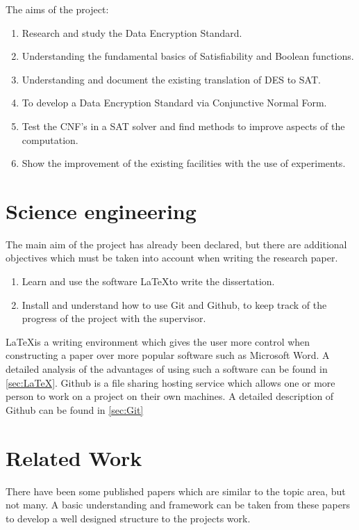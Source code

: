 \documentclass[11pt,a4paper]{report}
\begin{document}
The aims of the project:

\begin{enumerate}
\item Research and study the Data Encryption Standard.
\item Understanding the fundamental basics of Satisfiability and Boolean functions.
\item Understanding and document the existing translation of DES to SAT.
\item To develop a Data Encryption Standard via Conjunctive Normal Form.
\item Test the CNF's in a SAT solver and find methods to improve aspects of the computation.
\item Show the improvement of the existing facilities with the use of experiments.
\end{enumerate}


\section{Science engineering}
\label{sec:sciEng}
The main aim of the project has already been declared, but there are additional objectives which must be taken into account when writing the research paper. 
\begin{enumerate}
\item Learn and use the software \LaTeX \space to write the dissertation.
\item Install and understand how to use Git and Github, to keep track of the progress of the project with the supervisor.
\end{enumerate}
\LaTeX \space is a writing environment which gives the user more control when constructing a paper over more popular software such as Microsoft Word. A detailed analysis of the advantages of using such a software can be found in \ref{sec:LaTeX}.
Github is a file sharing hosting service which allows one or more person to work on a project on their own machines. A detailed description of Github can be found in \ref{sec:Git}



\section{Related Work}
\label{cha:RWork}

There have been some published papers which are similar to the topic area, but not many. A basic understanding and framework can be taken from these papers to develop a well designed structure to the projects work.
\end{document}
